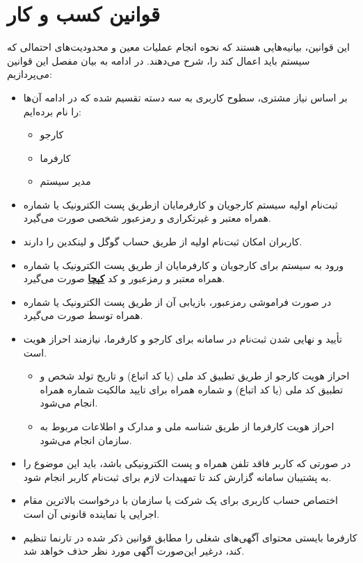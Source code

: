 \documentclass[12pt]{article}
\begin{document}
	\newpage

	\section{قوانین کسب و کار}
	این قوانین، بیانیه‌هایی هستند که نحوه انجام عملیات معین و محدودیت‌های احتمالی که سیستم باید اعمال کند را، شرح می‌دهند. در ادامه به بیان مفصل این قوانین می‌پردازیم:
	\begin{itemize}
		\item
		بر اساس نیاز مشتری، سطوح کاربری به سه دسته تقسیم شده که در ادامه آن‌ها را نام برده‌ایم:
		\begin{itemize}
			\item
			کارجو
			\item
			کارفرما
			\item
			مدیر سیستم
		\end{itemize}
		\item
		ثبت‌نام اولیه سیستم کارجویان و کارفرمایان از‌طریق پست الکترونیک یا شماره همراه معتبر و غیر‌تکراری و رمز‌عبور شخصی صورت می‌گیرد.
		\item
		کاربران امکان ثبت‌نام اولیه از طریق حساب گوگل و لینکدین را دارند.
		\item
		ورود به سیستم برای کارجویان و کارفرمایان از طر‌یق پست الکترونیک یا شماره همراه معتبر و رمز‌عبور و کد \textbf{\hyperref[ref:captcha]{کپچا}} صورت می‌گیرد.
		\item
		در‌ صورت فراموشی رمز‌عبور، بازیابی آن از طریق پست الکترونیک یا شماره همراه توسط صورت می‌گیرد.
		\item
		تأیید و نهایی شدن ثبت‌نام در سامانه برای کارجو و کارفرما، نیازمند احراز هویت است.
		\begin{itemize}
			\item
			احراز هویت کارجو از طریق تطبیق کد ملی (یا کد اتباع) و تاریخ تولد شخص و تطبیق کد ملی (یا کد اتباع) و شماره همراه برای تایید مالکیت شماره همراه انجام می‌شود.
			\item
			احراز هویت کارفرما از طریق شناسه ملی و مدارک و اطلاعات مربوط به سازمان انجام می‌شود.
		\end{itemize}
		\item
		در ‌صورتی که کاربر فاقد تلفن همراه و پست الکترونیکی باشد، باید این موضوع را به پشتیبان سامانه گزارش کند تا تمهیدات لازم برای ثبت‌نام کاربر انجام شود.
		\item
		اختصاص حساب کاربری برای یک شرکت یا سازمان با درخواست بالاترین مقام اجرایی یا نماینده قانونی آن است.
		\item
		کارفرما بایستی محتوای آگهی‌های شغلی را مطابق قوانین ذکر شده در تارنما تنظیم کند، درغیر‌ این‌صورت آگهی مورد نظر حذف خواهد شد.

\end{itemize}
\end{document}
